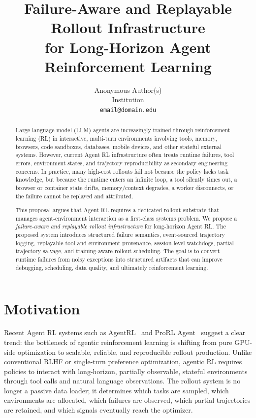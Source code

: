 \documentclass[11pt]{article}
\title{
Failure-Aware and Replayable Rollout Infrastructure\\
for Long-Horizon Agent Reinforcement Learning
}
\author{
Anonymous Author(s)\\
Institution\\
\texttt{email@domain.edu}
}
\date{}
\begin{document}
\maketitle

\begin{abstract}
Large language model (LLM) agents are increasingly trained through reinforcement learning (RL) in interactive, multi-turn environments involving tools, memory, browsers, code sandboxes, databases, mobile devices, and other stateful external systems.
However, current Agent RL infrastructure often treats runtime failures, tool errors, environment states, and trajectory reproducibility as secondary engineering concerns.
In practice, many high-cost rollouts fail not because the policy lacks task knowledge, but because the runtime enters an infinite loop, a tool silently times out, a browser or container state drifts, memory/context degrades, a worker disconnects, or the failure cannot be replayed and attributed.

This proposal argues that Agent RL requires a dedicated rollout substrate that manages agent-environment interaction as a first-class systems problem.
We propose a \emph{failure-aware and replayable rollout infrastructure} for long-horizon Agent RL.
The proposed system introduces structured failure semantics, event-sourced trajectory logging, replayable tool and environment provenance, session-level watchdogs, partial trajectory salvage, and training-aware rollout scheduling.
The goal is to convert runtime failures from noisy exceptions into structured artifacts that can improve debugging, scheduling, data quality, and ultimately reinforcement learning.
\end{abstract}

\section{Motivation}

Recent Agent RL systems such as AgentRL~\cite{zhang2025agentrl} and ProRL Agent~\cite{prorlagent2026} suggest a clear trend: the bottleneck of agentic reinforcement learning is shifting from pure GPU-side optimization to scalable, reliable, and reproducible rollout production.
Unlike conventional RLHF or single-turn preference optimization, agentic RL requires policies to interact with long-horizon, partially observable, stateful environments through tool calls and natural language observations.
The rollout system is no longer a passive data loader; it determines which tasks are sampled, which environments are allocated, which failures are observed, which partial trajectories are retained, and which signals eventually reach the optimizer.
\end{document}
